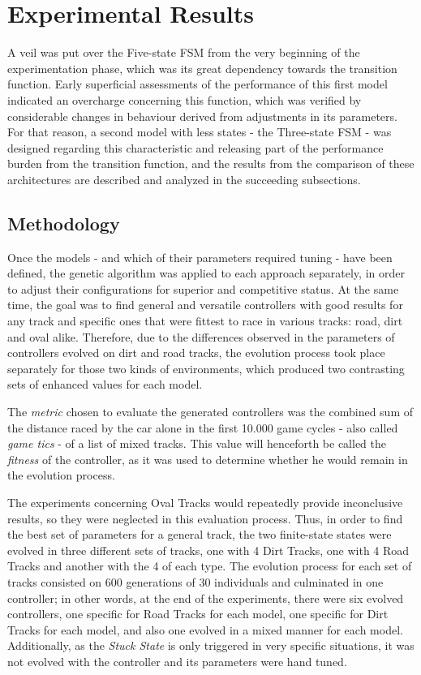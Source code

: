 \section{Experimental Results} \label{sec:Experiments}

	A veil was put over the Five-state FSM from the very beginning of the experimentation phase, which was its great
	dependency towards the transition function. Early superficial assessments of the performance of this first model
	indicated an overcharge concerning this function, which was verified by considerable changes in behaviour derived
	from adjustments in its parameters. For that reason, a second model with less states - the Three-state FSM - was
	designed regarding this characteristic and releasing part of the performance burden from the transition function,
	and the results from the comparison of these architectures are described and analyzed in the succeeding
	subsections.

\subsection{Methodology} \label{subsec:Methodology}

	Once the models - and which of their parameters required tuning - have been defined, the genetic algorithm was
	applied to each approach separately, in order to adjust their configurations for superior and competitive status.
	At the same time, the goal was to find general and versatile controllers with good results for any track and
	specific ones that were fittest to race in various tracks: road, dirt and oval alike. Therefore, due to the
	differences observed in the parameters of controllers evolved on dirt and road tracks, the evolution process took
	place separately for those two kinds of environments, which produced two contrasting sets of enhanced values for
	each model.
	
	The \emph{metric} chosen to evaluate the generated controllers was the combined sum of the distance raced by the
	car alone in the first 10.000 game cycles - also called \emph{game tics} - of a list of mixed tracks. This value
	will henceforth be called the \emph{fitness} of the controller, as it was used to determine whether he would
	remain in the evolution process.
	
	The experiments concerning Oval Tracks would repeatedly provide inconclusive results, so they were neglected in
	this evaluation process. Thus, in order to find the best set of parameters for a general track, the two
	finite-state states were evolved in three different sets of tracks, one with 4 Dirt Tracks, one with 4 Road
	Tracks and another with the 4 of each type. The evolution process for each set of tracks consisted on 600
	generations of 30 individuals and culminated in one controller; in other words, at the end of the experiments,
	there were six evolved controllers, one specific for Road Tracks for each model, one specific for Dirt Tracks for
	each model, and also one evolved in a mixed manner for each model. Additionally, as the \emph{Stuck State} is only
	triggered in very specific situations, it was not evolved with the controller and its parameters were hand tuned.
	
